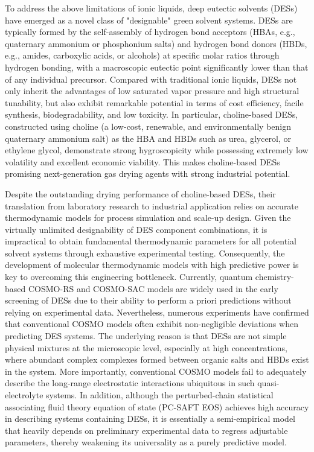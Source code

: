 \documentclass[AMA,LATO2COL]{WileyNJDv5} %
\begin{document}
To address the above limitations of ionic liquids, deep eutectic solvents (DESs) have emerged as a novel class of "designable" green solvent systems. DESs are typically formed by the self-assembly of hydrogen bond acceptors (HBAs, e.g., quaternary ammonium or phosphonium salts) and hydrogen bond donors (HBDs, e.g., amides, carboxylic acids, or alcohols) at specific molar ratios through hydrogen bonding, with a macroscopic eutectic point significantly lower than that of any individual precursor. Compared with traditional ionic liquids, DESs not only inherit the advantages of low saturated vapor pressure and high structural tunability, but also exhibit remarkable potential in terms of cost efficiency, facile synthesis, biodegradability, and low toxicity. In particular, choline-based DESs, constructed using choline (a low-cost, renewable, and environmentally benign quaternary ammonium salt) as the HBA and HBDs such as urea, glycerol, or ethylene glycol, demonstrate strong hygroscopicity while possessing extremely low volatility and excellent economic viability. This makes choline-based DESs promising next-generation gas drying agents with strong industrial potential.

Despite the outstanding drying performance of choline-based DESs, their translation from laboratory research to industrial application relies on accurate thermodynamic models for process simulation and scale-up design. Given the virtually unlimited designability of DES component combinations, it is impractical to obtain fundamental thermodynamic parameters for all potential solvent systems through exhaustive experimental testing. Consequently, the development of molecular thermodynamic models with high predictive power is key to overcoming this engineering bottleneck. Currently, quantum chemistry-based COSMO-RS and COSMO-SAC models are widely used in the early screening of DESs due to their ability to perform a priori predictions without relying on experimental data. Nevertheless, numerous experiments have confirmed that conventional COSMO models often exhibit non-negligible deviations when predicting DES systems. The underlying reason is that DESs are not simple physical mixtures at the microscopic level, especially at high concentrations, where abundant complex complexes formed between organic salts and HBDs exist in the system. More importantly, conventional COSMO models fail to adequately describe the long-range electrostatic interactions ubiquitous in such quasi-electrolyte systems. In addition, although the perturbed-chain statistical associating fluid theory equation of state (PC-SAFT EOS) achieves high accuracy in describing systems containing DESs, it is essentially a semi-empirical model that heavily depends on preliminary experimental data to regress adjustable parameters, thereby weakening its universality as a purely predictive model.
\end{document}
